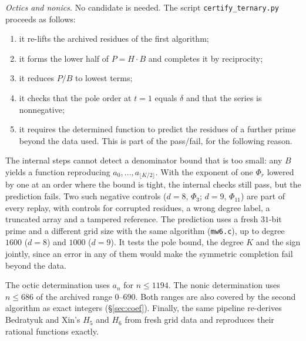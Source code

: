 \documentclass[11pt]{amsart}
\theoremstyle{definition}
\theoremstyle{remark}
\begin{document}
\emph{Octics and nonics.} No candidate is needed. The script \texttt{certify\_ternary.py} proceeds as follows:
\begin{enumerate}
\item it re-lifts the archived residues of the first algorithm;
\item it forms the lower half of $P=H\cdot B$ and completes it by reciprocity;
\item it reduces $P/B$ to lowest terms;
\item it checks that the pole order at $t=1$ equals $\delta$ and that the series is nonnegative;
\item it requires the determined function to predict the residues of a further prime beyond the data used. This is part of the pass/fail, for the following reason.
\end{enumerate}
The internal steps cannot detect a denominator bound that is too small: any $B$ yields a function reproducing $a_0,\dots,a_{\lfloor K/2\rfloor}$. With the exponent of one $\Phi_r$ lowered by one at an order where the bound is tight, the internal checks still pass, but the prediction fails. Two such negative controls ($d=8$, $\Phi_3$; $d=9$, $\Phi_{11}$) are part of every replay, with controls for corrupted residues, a wrong degree label, a truncated array and a tampered reference. The prediction uses a fresh $31$-bit prime and a different grid size with the same algorithm (\texttt{mw6.c}), up to degree $1600$ ($d=8$) and $1000$ ($d=9$). It tests the pole bound, the degree $K$ and the sign jointly, since an error in any of them would make the symmetric completion fail beyond the data.

The octic determination uses $a_n$ for $n\le1194$. The nonic determination uses $n\le686$ of the archived range $0$--$690$. Both ranges are also covered by the second algorithm as exact integers (\S\ref{sec:coef}). Finally, the same pipeline re-derives Bedratyuk and Xin's $H_5$ and $H_6$ from fresh grid data and reproduces their rational functions exactly.
\end{document}
